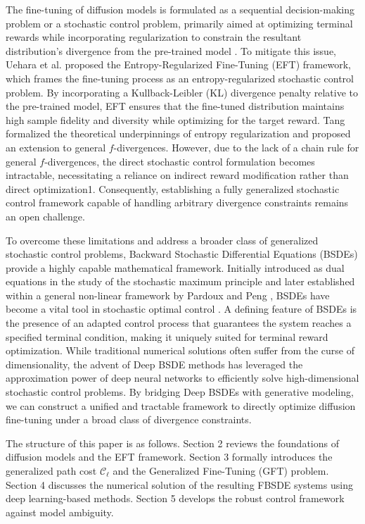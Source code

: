 \documentclass[11pt]{article}
\begin{document}
The fine-tuning of diffusion models is formulated as a sequential decision-making problem or a stochastic control problem, primarily aimed at optimizing terminal rewards while incorporating regularization to constrain the resultant distribution's divergence from the pre-trained model \cite{clark2023directly}. To mitigate this issue, Uehara et al. \cite{uehara2024fine} proposed the Entropy-Regularized Fine-Tuning (EFT) framework, which frames the fine-tuning process as an entropy-regularized stochastic control problem. By incorporating a Kullback-Leibler (KL) divergence penalty relative to the pre-trained model, EFT ensures that the fine-tuned distribution maintains high sample fidelity and diversity while optimizing for the target reward. Tang \cite{tang2025finetuningdiffusionmodelsstochastic} formalized the theoretical underpinnings of entropy regularization and proposed an extension to general $f$-divergences. However, due to the lack of a chain rule for general $f$-divergences, the direct stochastic control formulation becomes intractable, necessitating a reliance on indirect reward modification rather than direct optimization1. Consequently, establishing a fully generalized stochastic control framework capable of handling arbitrary divergence constraints remains an open challenge.

To overcome these limitations and address a broader class of generalized stochastic control problems, Backward Stochastic Differential Equations (BSDEs) provide a highly capable mathematical framework. Initially introduced as dual equations in the study of the stochastic maximum principle \cite{bismut1973conjugate} and later established within a general non-linear framework by Pardoux and Peng \cite{pardoux1990adapted}, BSDEs have become a vital tool in stochastic optimal control \cite{peng1992stochastic, peng1993backward}. A defining feature of BSDEs is the presence of an adapted control process that guarantees the system reaches a specified terminal condition, making it uniquely suited for terminal reward optimization. While traditional numerical solutions often suffer from the curse of dimensionality, the advent of Deep BSDE methods \cite{han2018solving} has leveraged the approximation power of deep neural networks to efficiently solve high-dimensional stochastic control problems. By bridging Deep BSDEs with generative modeling, we can construct a unified and tractable framework to directly optimize diffusion fine-tuning under a broad class of divergence constraints.

The structure of this paper is as follows. Section 2 reviews the foundations of diffusion models and the EFT framework. Section 3 formally introduces the generalized path cost $\mathcal{C}_\ell$ and the Generalized Fine-Tuning (GFT) problem. Section 4 discusses the numerical solution of the resulting FBSDE systems using deep learning-based methods. Section 5 develops the robust control framework against model ambiguity. 
\end{document}
